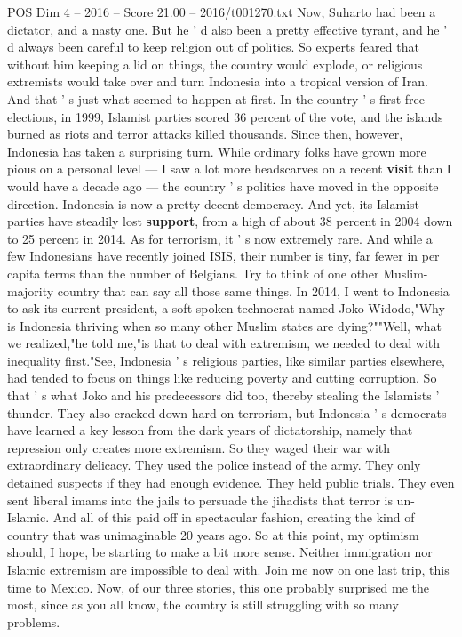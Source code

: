 \begin{textsample}{POS Dim 4 – 2016 – Score 21.00 – 2016/t001270.txt}
Now, Suharto had been a dictator, and a nasty one.
But he ' d also been a pretty effective tyrant, and he ' d always been careful to keep religion out of politics.
So experts feared that without him keeping a lid on things, the country would explode, or religious extremists would take over and turn Indonesia into a tropical version of Iran.
And that ' s just what seemed to happen at first.
In the country ' s first free elections, in 1999, Islamist parties scored 36 percent of the vote, and the islands burned as riots and terror attacks killed thousands.
Since then, however, Indonesia has taken a surprising turn.
While ordinary folks have grown more pious on a personal level — I saw a lot more headscarves on a recent \textbf{visit} than I would have a decade ago — the country ' s politics have moved in the opposite direction.
Indonesia is now a pretty decent democracy.
And yet, its Islamist parties have steadily lost \textbf{support}, from a high of about 38 percent in 2004 down to 25 percent in 2014.
As for terrorism, it ' s now extremely rare.
And while a few Indonesians have recently joined ISIS, their number is tiny, far fewer in per capita terms than the number of Belgians.
Try to think of one other Muslim-majority country that can say all those same things.
In 2014, I went to Indonesia to ask its current president, a soft-spoken technocrat named Joko Widodo,"Why is Indonesia thriving when so many other Muslim states are dying?""Well, what we realized,"he told me,"is that to deal with extremism, we needed to deal with inequality first."See, Indonesia ' s religious parties, like similar parties elsewhere, had tended to focus on things like reducing poverty and cutting corruption.
So that ' s what Joko and his predecessors did too, thereby stealing the Islamists ' thunder.
They also cracked down hard on terrorism, but Indonesia ' s democrats have learned a key lesson from the dark years of dictatorship, namely that repression only creates more extremism.
So they waged their war with extraordinary delicacy.
They used the police instead of the army.
They only detained suspects if they had enough evidence.
They held public trials.
They even sent liberal imams into the jails to persuade the jihadists that terror is un-Islamic.
And all of this paid off in spectacular fashion, creating the kind of country that was unimaginable 20 years ago.
So at this point, my optimism should, I hope, be starting to make a bit more sense.
Neither immigration nor Islamic extremism are impossible to deal with.
Join me now on one last trip, this time to Mexico.
Now, of our three stories, this one probably surprised me the most, since as you all know, the country is still struggling with so many problems.

\end{textsample}
